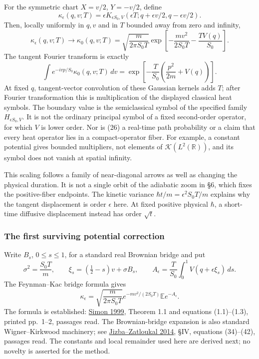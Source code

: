 \documentclass[11pt,a4paper]{article}
\begin{document}
For the symmetric chart \(X=v/2\), \(Y=-v/2\), define \[
 \kappa_\epsilon(q,v;T)
 =\epsilon K_{\epsilon S_0,V}
       (\epsilon T;q+\epsilon v/2,q-\epsilon v/2).
 \tag{24}
\] Then, locally uniformly in \(q,v\) and in \(T\) bounded away from
zero and infinity, \[
 \kappa_\epsilon(q,v;T)\longrightarrow
 \kappa_0(q,v;T)
 =\sqrt{\frac m{2\pi S_0T}}
   \exp\!\left[-\frac{mv^2}{2S_0T}-\frac{TV(q)}{S_0}\right].
 \tag{25}
\] The tangent Fourier transform is exactly \[
 \int e^{-ivp/S_0}\kappa_0(q,v;T)\,dv
 =\exp\!\left[-\frac T{S_0}
              \left(\frac{p^2}{2m}+V(q)\right)\right].
 \tag{26}
\] At fixed \(q\), tangent-vector convolution of these Gaussian kernels
adds \(T\); after Fourier transformation this is multiplication of the
displayed classical heat symbols. The boundary value is the
semiclassical symbol of the specified family \(H_{\epsilon S_0,V}\). It
is not the ordinary principal symbol of a fixed second-order operator,
for which \(V\) is lower order. Nor is (26) a real-time path probability
or a claim that every heat operator lies in a compact-operator fiber.
For example, a constant potential gives bounded multipliers, not
elements of \(\mathcal K(L^2(\mathbb R))\), and its symbol does not
vanish at spatial infinity.

This scaling follows a family of near-diagonal arrows as well as
changing the physical duration. It is not a single orbit of the
adiabatic zoom in §6, which fixes the positive-fiber endpoints. The
kinetic variance \(\hbar t/m=\epsilon^2 S_0T/m\) explains why the
tangent displacement is order \(\epsilon\) here. At fixed positive
physical \(\hbar\), a short-time diffusive displacement instead has
order \(\sqrt t\).

\subsubsection{The first surviving potential
correction}\label{the-first-surviving-potential-correction}

Write \(B_s\), \(0\le s\le1\), for a standard real Brownian bridge and
put \[
 \sigma^2=\frac{S_0T}{m},\qquad
 \xi_s=(\tfrac12-s)v+\sigma B_s,\qquad
 A_\epsilon=\frac T{S_0}\int_0^1 V(q+\epsilon\xi_s)\,ds.
\] The Feynman--Kac bridge formula gives \[
 \kappa_\epsilon
 =\sqrt{\frac m{2\pi S_0T}}e^{-mv^2/(2S_0T)}
     \mathbb E e^{-A_\epsilon}.
 \tag{27}
\] The formula is established:
\href{https://arxiv.org/pdf/math-ph/9907022}{Simon 1999}, Theorem 1.1
and equations (1.1)--(1.3), printed pp.~1--2, passages read. The
Brownian-bridge expansion is also standard Wigner--Kirkwood machinery;
see \href{https://arxiv.org/pdf/1309.0206}{Jizba--Zatloukal 2014}, §IV,
equations (34)--(42), passages read. The constants and local remainder
used here are derived next; no novelty is asserted for the method.
\end{document}
